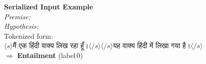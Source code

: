 \documentclass[12pt]{article}
\begin{document}
\begin{center}
{\Large\bfseries Serialized Input Example}\\[0.6em]
{\normalsize\itshape Premise:}\\[0.4em]
{\normalsize\itshape Hypothesis:}\\[0.8em]
{\small Tokenized form:}\\[0.3em]
{\Large $\langle s\rangle$\enspace मैं एक हिंदी वाक्य लिख रहा हूँ।\enspace $\langle/s\rangle\langle/s\rangle$\enspace यह वाक्य हिंदी में लिखा गया है।\enspace $\langle/s\rangle$}\\[0.8em]
{\normalsize $\Rightarrow$ \textbf{Entailment} (label\,0)}
\end{center}
\end{document}
